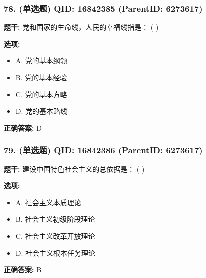 \documentclass[12pt,UTF8]{ctexart}
\begin{document}
\vspace{0.3em}\hrulefill\vspace{0.7em}

\subsubsection*{78. (单选题) \small QID: 16842385 (ParentID: 6273617)}

\textbf{题干:}
党和国家的生命线，人民的幸福线指是： ( )



\textbf{选项:}
\begin{itemize}[leftmargin=*]

  \item A. 党的基本纲领

  \item B. 党的基本经验

  \item C. 党的基本方略

  \item D. 党的基本路线

\end{itemize}

\textbf{正确答案:}
D

\vspace{0.3em}\hrulefill\vspace{0.7em}

\subsubsection*{79. (单选题) \small QID: 16842386 (ParentID: 6273617)}

\textbf{题干:}
建设中国特色社会主义的总依据是： ( )



\textbf{选项:}
\begin{itemize}[leftmargin=*]

  \item A. 社会主义本质理论

  \item B. 社会主义初级阶段理论

  \item C. 社会主义改革开放理论

  \item D. 社会主义根本任务理论

\end{itemize}

\textbf{正确答案:}
B

\vspace{0.3em}\hrulefill\vspace{0.7em}
\end{document}
